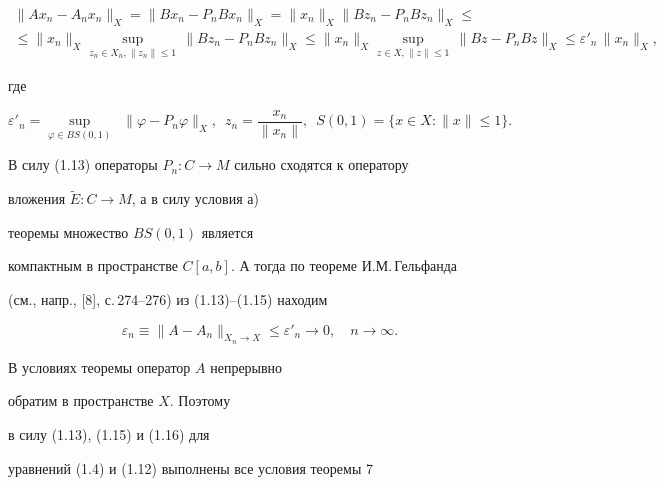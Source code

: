\begin{multline}


\|Ax_n-A_nx_n\|_X=\|Bx_n-P_nBx_n\|_X=\|x_n\|_X \|Bz_n-P_nBz_n\|_X\leq \\


%


\leq \|x_n\|_X \sup_{z_n\in X_n, \|z_n\|\leq 1}\,


\|Bz_n-P_nBz_n\|_X\leq 


%


\|x_n\|_X \sup_{z\in X, \|z\|\leq 1}\,


\|Bz-P_nBz\|_X\leq \varepsilon'_n\, \|x_n\|_X,


\end{multline}


где


\begin{equation}


\varepsilon'_n=\sup_{\varphi\in BS(0,1)}\ \; \|\varphi -P_n\varphi\|_X,


\ \; z_n=\frac{x_n}{\|x_n\|},\ \; S(0,1)=\bigl\{ x\in X :


\|x\|\leq 1\bigr\}.


\end{equation}





В силу (1.13) операторы $P_n:C\rightarrow M$ сильно сходятся к оператору


вложения $\widetilde{E}:C\rightarrow M$, а в силу условия а)


теоремы множество $BS(0,1)$ является


компактным в пространстве $C[a,b]$. А тогда по теореме И.М.\,Гельфанда


(см., напр., [8], с.\,274--276) из (1.13)--(1.15) находим


\begin{equation}


\varepsilon_n\equiv \|A-A_n\|_{X_n\rightarrow X}\leq \varepsilon'_n


\rightarrow 0, \quad n\rightarrow \infty .


\end{equation}





В условиях теоремы оператор $A$ непрерывно 


обратим в пространстве $X$. Поэтому


в силу (1.13), (1.15) и (1.16) для 


уравнений (1.4) и (1.12) выполнены все условия теоремы 7


